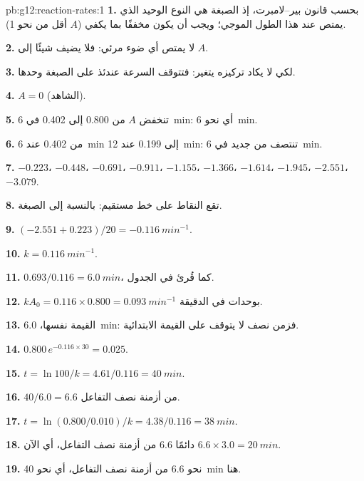 \begin{solution}{pb:g12:reaction-rates:1}
\textbf{1.} بحسب قانون بير--لامبرت، إذ الصبغة هي النوع الوحيد
الذي يمتص عند هذا الطول الموجي؛ ويجب أن يكون  مخففًا بما يكفي
($A$ أقل من نحو 1).

\textbf{2.} لا يمتص أي ضوء مرئي: فلا يضيف شيئًا إلى $A$.

\textbf{3.} لكي لا يكاد تركيزه يتغير: فتتوقف السرعة عندئذ
على الصبغة وحدها.

\textbf{4.} $A = 0$ (الشاهد).

\textbf{5.} تنخفض $A$ من 0.800 إلى 0.402 في \qty{6}{min}: أي نحو
\qty{6}{min}.

\textbf{6.} من 0.402 عند \qty{6}{min} إلى 0.199 عند \qty{12}{min}: تنتصف
من جديد في \qty{6}{min}.

\textbf{7.} $-0.223$، $-0.448$، $-0.691$، $-0.911$، $-1.155$، $-1.366$،
$-1.614$، $-1.945$، $-2.551$، $-3.079$.

\textbf{8.} تقع النقاط على خط مستقيم: 
بالنسبة إلى الصبغة.

\textbf{9.} $(-2.551 + 0.223)/20 = \qty{-0.116}{min^{-1}}$.

\textbf{10.} $k = \qty{0.116}{min^{-1}}$.

\textbf{11.} $0.693 / 0.116 = \qty{6.0}{min}$، كما قُرئ في الجدول.

\textbf{12.} $k A_0 = 0.116 \times 0.800 = \qty{0.093}{min^{-1}}$ بوحدات
 في الدقيقة.

\textbf{13.} القيمة نفسها، \qty{6.0}{min}: فزمن نصف  لا
يتوقف على القيمة الابتدائية.

\textbf{14.} $0.800\, e^{-0.116 \times 30} = 0.025$.

\textbf{15.} $t = \ln 100 / k = 4.61 / 0.116 = \qty{40}{min}$.

\textbf{16.} $40 / 6.0 = 6.6$ من أزمنة نصف التفاعل.

\textbf{17.} $t = \ln(0.800/0.010)/k = 4.38 / 0.116 = \qty{38}{min}$.

\textbf{18.} دائمًا 6.6 من أزمنة نصف التفاعل، أي الآن $6.6 \times 3.0 = \qty{20}{min}$.

\textbf{19.} نحو 6.6 من أزمنة نصف التفاعل، أي نحو \qty{40}{min} هنا.
\end{solution}
